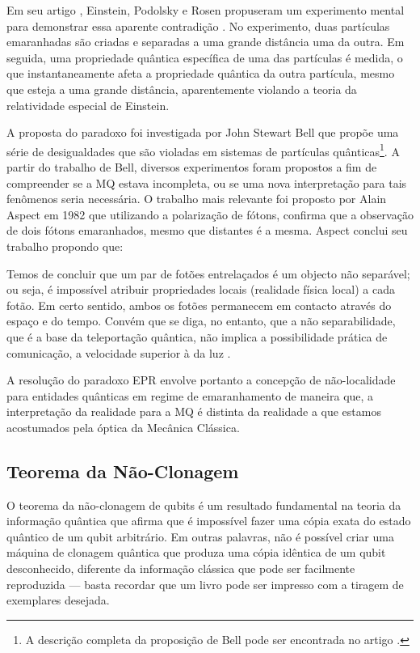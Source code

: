 Em seu artigo \textit{}, Einstein, Podolsky e Rosen propuseram um experimento mental para demonstrar essa aparente contradição \cite{epr}. No experimento, duas partículas emaranhadas são criadas e separadas a uma grande distância uma da outra. Em seguida, uma propriedade quântica específica de uma das partículas é medida, o que instantaneamente afeta a propriedade quântica da outra partícula, mesmo que esteja a uma grande distância, aparentemente violando a teoria da relatividade especial de Einstein.


A proposta do paradoxo foi investigada por John Stewart Bell que propõe uma série de desigualdades que são violadas em sistemas de partículas quânticas\footnote{A descrição completa da proposição de Bell pode ser encontrada no artigo \textcite{Bell}.}. A partir do trabalho de Bell, diversos experimentos foram propostos a fim de compreender se a MQ estava incompleta, ou se uma nova interpretação para tais fenômenos seria necessária. O trabalho mais relevante foi proposto por Alain Aspect em 1982 que utilizando a polarização de fótons, confirma que a observação de dois fótons emaranhados, mesmo que distantes é a mesma. Aspect conclui seu trabalho propondo que:

\begin{citacao}
  Temos de concluir que um par de fotões entrelaçados é um objecto não separável; ou seja, é impossível atribuir propriedades locais (realidade física local) a cada fotão. Em certo sentido, ambos os fotões permanecem em contacto através do espaço e do tempo. Convém que se diga, no entanto, que a não separabilidade, que é a base da teleportação quântica, não implica a possibilidade prática de comunicação, a velocidade superior à da luz \cite{aspect}.
\end{citacao}
A resolução do paradoxo EPR envolve portanto a concepção de não-localidade para entidades quânticas em regime de emaranhamento de maneira que, a interpretação da realidade para a MQ é distinta da realidade a que estamos acostumados pela óptica da Mecânica Clássica.

\subsection{Teorema da Não-Clonagem}\label{sec:naoclonagem}

O teorema da não-clonagem de qubits é um resultado fundamental na teoria da informação quântica que afirma que é impossível fazer uma cópia exata do estado quântico de um qubit arbitrário. Em outras palavras, não é possível criar uma máquina de clonagem quântica que produza uma cópia idêntica de um qubit desconhecido, diferente da informação clássica que pode ser facilmente reproduzida --- basta recordar que um livro pode ser impresso com a tiragem de exemplares desejada.


